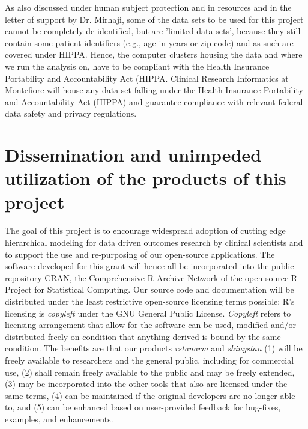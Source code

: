 \documentclass[11pt,notitlepage]{article}
\begin{document}
As also discussed under human subject protection and in resources and in the letter of support by Dr. Mirhaji, some of the data sets to 
be used for this project cannot be completely de-identified, but are 'limited data sets', because they still contain some patient 
identifiers (e.g., age in years or zip code) and as such are covered under HIPPA. Hence, the computer clusters housing the data and where 
we run the analysis on, have to be compliant with the Health Insurance Portability and Accountability Act (HIPPA. Clinical Research 
Informatics at Montefiore will house any data set falling under the Health Insurance Portability and Accountability Act (HIPPA) and 
guarantee compliance with relevant federal data safety and privacy regulations. 

\section*{Dissemination and unimpeded utilization of the products of this project}
The goal of this project is to encourage widespread adoption of cutting edge 
hierarchical modeling for data driven outcomes research by clinical scientists and to support the use and re-purposing of our 
open-source applications. The software developed for this grant will hence all be incorporated into the public repository CRAN, 
the Comprehensive R Archive Network of the open-source R Project for Statistical Computing. Our source code and documentation 
will be distributed under the least restrictive open-source licensing terms possible: R's licensing is \textit{copyleft} under the 
GNU General Public License. \textit{Copyleft} refers to licensing arrangement that allow for the software can be used, modified and/or 
distributed freely on condition that anything derived is bound by the same condition. The benefits  are that our products 
\textit{rstanarm} and \textit{shinystan} (1) will be freely available to researchers and the general public, including for commercial use, (2) shall remain freely available to the public and may be freely extended, (3) may be incorporated into the other tools that also are licensed under the same terms, (4) can be maintained if the original developers are no longer able to, and (5) can be enhanced based on user-provided feedback for bug-fixes, examples, and enhancements.
\end{document}
